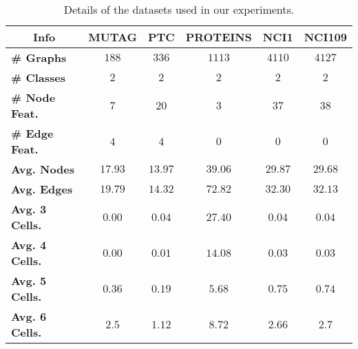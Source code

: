 \documentclass{article}
\begin{document}
\begin{table}[t]
\begin{center}
\caption{Details of the datasets used in our experiments.}
\label{tab:dataset_details}
\begin{tabular}{lccccc}
\toprule
\multicolumn{1}{c}{Info}  & \multicolumn{1}{c}{MUTAG} & \multicolumn{1}{c}{PTC} & \multicolumn{1}{c}{PROTEINS} & \multicolumn{1}{c}{NCI1} & \multicolumn{1}{c}{NCI109} \\  \bottomrule
\textbf{\# Graphs} & 
\multicolumn{1}{c}{$188$} & 
\multicolumn{1}{c}{$336$} & 
\multicolumn{1}{c}{$1113$} & 
\multicolumn{1}{c}{$4110$} & 
\multicolumn{1}{c}{$4127$} \\
\textbf{\# Classes}            & 
\multicolumn{1}{c}{$2$} & 
\multicolumn{1}{c}{$2$} & 
\multicolumn{1}{c}{$2$}& 
\multicolumn{1}{c}{$2$} & 
\multicolumn{1}{c}{$2$} \\
\textbf{\# Node Feat.}            & 
\multicolumn{1}{c}{$7$} & 
\multicolumn{1}{c}{$20$} & 
\multicolumn{1}{c}{$3$}& 
\multicolumn{1}{c}{$37$} & 
\multicolumn{1}{c}{$38$} \\
\textbf{\# Edge Feat.}            & 
\multicolumn{1}{c}{$4$} & 
\multicolumn{1}{c}{$4$} & 
\multicolumn{1}{c}{$0$}& 
\multicolumn{1}{c}{$0$} & 
\multicolumn{1}{c}{$0$} \\
\textbf{Avg. Nodes}            & 
\multicolumn{1}{c}{$17.93$} & 
\multicolumn{1}{c}{$13.97$} & 
\multicolumn{1}{c}{$39.06$}& 
\multicolumn{1}{c}{$29.87$} & 
\multicolumn{1}{c}{$29.68$} \\
\textbf{Avg. Edges}            & 
\multicolumn{1}{c}{$19.79$} & 
\multicolumn{1}{c}{$14.32$} & 
\multicolumn{1}{c}{$72.82$}& 
\multicolumn{1}{c}{$32.30$} & 
\multicolumn{1}{c}{$32.13$} \\
\textbf{Avg. 3 Cells.}            & 
\multicolumn{1}{c}{$0.00$} & 
\multicolumn{1}{c}{$0.04$} & 
\multicolumn{1}{c}{$27.40$}& 
\multicolumn{1}{c}{$0.04$} & 
\multicolumn{1}{c}{$0.04$} \\
\textbf{Avg. 4 Cells.}            & 
\multicolumn{1}{c}{$0.00$} & 
\multicolumn{1}{c}{$0.01$} & 
\multicolumn{1}{c}{$14.08$}& 
\multicolumn{1}{c}{$0.03$} & 
\multicolumn{1}{c}{$0.03$} \\
\textbf{Avg. 5 Cells.}            & 
\multicolumn{1}{c}{$0.36$} & 
\multicolumn{1}{c}{$0.19$} & 
\multicolumn{1}{c}{$5.68$}& 
\multicolumn{1}{c}{$0.75$} & 
\multicolumn{1}{c}{$0.74$} \\
\textbf{Avg. 6 Cells.}            & 
\multicolumn{1}{c}{$2.5$} & 
\multicolumn{1}{c}{$1.12$} & 
\multicolumn{1}{c}{$8.72$}& 
\multicolumn{1}{c}{$2.66$} & 
\multicolumn{1}{c}{$2.7$} \\
\bottomrule
\end{tabular}
\end{center}
\end{table}
\end{document}
